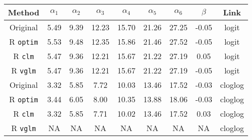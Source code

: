 
\begin{tabular}{ccccccccc}
\toprule
Method & $\alpha_1$ & $\alpha_2$ & $\alpha_3$ & $\alpha_4$ & $\alpha_5$ & $\alpha_6$ & $\beta$ & Link\\
\midrule
Original \citep{candy1991modeling} & 5.49 & 9.39 & 12.23 & 15.70 & 21.26 & 27.25 & -0.05 & logit\\
R \verb+optim+ & 5.53 & 9.48 & 12.35 & 15.86 & 21.46 & 27.52 & -0.05 & logit\\
R \verb+clm+ & 5.47 & 9.36 & 12.21 & 15.67 & 21.22 & 27.19 & 0.05 & logit\\
R \verb+vglm+ & 5.47 & 9.36 & 12.21 & 15.67 & 21.22 & 27.19 & -0.05 & logit\\
\addlinespace
Original \citep{candy1991modeling} & 3.32 & 5.85 & 7.72 & 10.03 & 13.46 & 17.52 & -0.03 & cloglog\\
R \verb+optim+ & 3.44 & 6.05 & 8.00 & 10.35 & 13.88 & 18.06 & -0.03 & cloglog\\
R \verb+clm+ & 3.32 & 5.85 & 7.71 & 10.02 & 13.46 & 17.52 & 0.03 & cloglog\\
R \verb+vglm+ & NA & NA & NA & NA & NA & NA & NA & cloglog\\
\bottomrule
\end{tabular}